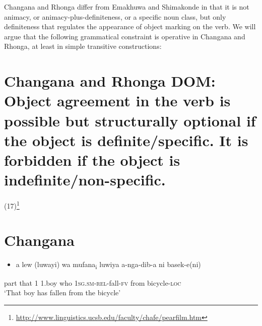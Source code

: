 \documentclass[output=paper]{langsci/langscibook}
\begin{document}
Changana and Rhonga differ from Emakhuwa and Shimakonde in that it is not animacy, or animacy-plus-definiteness, or a specific noun class, but only definiteness that regulates the appearance of object marking on the verb. We will argue that the following grammatical constraint is operative in Changana and Rhonga, at least in simple transitive constructions:

\chapter[Changana and Rhonga DOM: Object agreement in the verb is possible but structurally optional if the object is definite/specific. It is forbidden if the object is indefinite/non{}-specific.]{Changana and Rhonga DOM: Object agreement in the verb is possible but structurally optional if the object is definite/specific. It is forbidden if the object is indefinite/non-specific.}
     (17)\footnote{\url{http://www.linguistics.ucsb.edu/faculty/chafe/pearfilm.htm}}\textstyleFontepargpadroi{ }\\
\chapter[Changana]{Changana}
\label{bkm:Ref455884948}\setcounter{itemize}{0}
\begin{itemize}
\item \gll a         lew (luwayi)  wa    mufana\textup{\textsubscript{i}}   luwiya    a-nga-dib-a             ni          basek-e(ni)\\
\end{itemize}
     part    that                 1      1.boy       who       \textsc{1sg.sm-rel}{}-fall-\textsc{fv}  from     bicycle-\textsc{loc}\\
\glt ‘That boy has fallen from the bicycle’
\z
\end{document}
